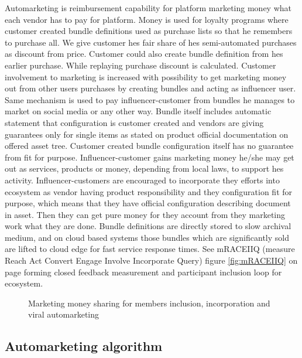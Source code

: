 Automarketing is reimbursement capability for platform marketing money what each vendor has to pay for platform. Money is used for loyalty programs where customer created bundle definitions used as purchase lists so that he remembers to purchase all. We give customer hes fair share of hes semi-automated purchases as discount from price. Customer could also create  bundle definition from hes earlier purchase. While replaying purchase discount is calculated. Customer involvement to marketing is increased with possibility to get marketing money out from other users purchases by creating bundles and acting as influencer user. Same mechanism is used to pay influencer-customer from bundles he manages to market on social media or any other way. Bundle itself includes automatic statement that configuration is customer created and  vendors are giving guarantees only for single items as stated on product official documentation on offered asset tree. Customer created bundle configuration itself has no guarantee from fit for purpose. Influencer-customer gains marketing money he/she may get out as services, products or money, depending from local laws,  to support hes activity. Influencer-customers are encouraged to incorporate they efforts into ecosystem as vendor having product responsibility and they configuration fit for purpose, which means that they have official configuration describing document in asset. Then they can get pure money for they account from they marketing work what they are done. Bundle definitions are directly stored to slow archival medium, and on cloud based systems those bundles which are significantly sold are lifted to cloud edge for fast service response times. See mRACEIIQ (measure Reach Act Convert Engage Involve Incorporate Query) figure \ref{fig:mRACEIIQ} on page \pageref{fig:mRACEIIQ} forming closed feedback measurement and participant inclusion loop for ecosystem.

\begin{figure} %
 \begin{center}
  \caption{Marketing money sharing for members inclusion, incorporation and viral automarketing}
  \label{fig:automarket}
 \end{center}
\end{figure}

\subsection{Automarketing algorithm}
\label{automarketing}

